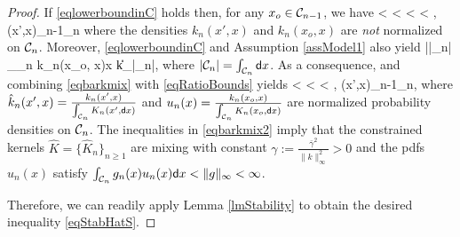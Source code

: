 \documentclass[onefignum,onetabnum]{siamonline250211}%
\begin{document}
\begin{proof}
If \eqref{eqlowerboundinC} holds then, for any $x_o \in {\mathcal C}_{n-1}$, we have
 <  <  <  < \infty, \quad \forall (x',x)\in\mC_{n-1}\times\mC_n
\label{eqbarkmix}
\eeq 
where the densities $k_n(x',x)$ and $k_n(x_o,x)$ are {\em not} normalized on ${\mathcal C}_n$. Moreover, \eqref{eqlowerboundinC} and Assumption \ref{assModel1} also yield
\beq
\bar\gamma |\mC_n| \le \int_{\mC_n} k_n(x_o, x)\sd x \le \|k\|_\infty|\mC_n|, \quad {}
\nn
\eeq
where $|{\mathcal C}_n|=\int_{{\mathcal C}_n} {\sf d} x$. As a consequence,
\beq
{} \le {} \le {}
\label{eqRatioBounds}
\eeq
and combining \eqref{eqbarkmix} with \eqref{eqRatioBounds} yields 
\beq
{} <  <  < \infty, \quad \forall (x',x)\in\mC_{n-1}\times\mC_n,
\label{eqbarkmix2}
\eeq 
where $\hat k_n(x',x) = \frac{k_n(x',x)}{\int_{{\mathcal C}_n} K_n(x', {\sf d} x)}$ and $u_n(x)=\frac{k_n(x_o,x)}{\int_{{\mathcal C}_n} K_n(x_o, {\sf d} x)}$ are normalized probability densities on ${\mathcal C}_n$. The inequalities in \eqref{eqbarkmix2} imply that the constrained kernels $\hat K=\{\hat K_n\}_{n \ge 1}$ are mixing with constant $\gamma := \frac{\bar\gamma^2}{\|k\|_\infty^2}>0$ and the pdfs $u_n(x)$ satisfy $\int_{{\mathcal C}_n} g_n(x) u_n(x){\sf d} x < \|g\|_\infty < \infty$.



Therefore, we can readily apply Lemma \ref{lmStability} to obtain the desired inequality \eqref{eqStabHatS}. 
\end{proof}
\end{document}
